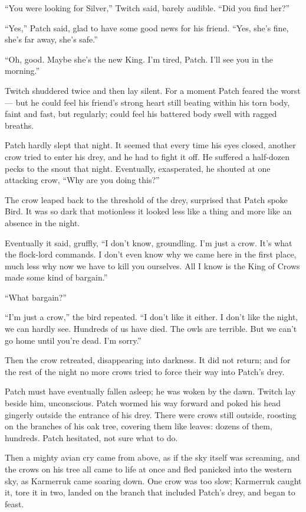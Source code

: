 \documentclass[ebook,oneside,openany,17pt]{memoir}
\newenvironment{tolerant}[1]{%
  \par\tolerance=#1\relax
}{%
  \par
}
\begin{document}
“You were looking for Silver,” Twitch said, barely audible. “Did you
find her?”

“Yes,” Patch said, glad to have some good news for his friend. “Yes,
she’s fine, she’s far away, she’s safe.”

“Oh, good. Maybe she’s the new King. I’m tired, Patch. I’ll see you in
the morning.”

Twitch shuddered twice and then lay silent. For a moment Patch feared
the worst — but he could feel his friend’s strong heart still beating
within his torn body, faint and fast, but regularly; could feel his
battered body swell with ragged breaths.

Patch hardly slept that night. It seemed that every time his eyes
closed, another crow tried to enter his drey, and he had to fight it
off. He suffered a half-dozen pecks to the snout that
night. Eventually, exasperated, he shouted at one attacking crow, “Why
are you doing this?”

The crow leaped back to the threshold of the drey, surprised that
Patch spoke Bird. It was so dark that motionless it looked less like a
thing and more like an absence in the night.

\begin{tolerant}{500}
Eventually it said, gruffly, “I don’t know, groundling. I’m just a
crow. It’s what the flock-lord commands. I don’t even know why we came
here in the first place, much less why now we have to kill you
ourselves. All I know is the King of Crows made some kind of bargain.”
\end{tolerant}

“What bargain?”

“I’m just a crow,” the bird repeated. “I don’t like it either. I don’t
like the night, we can hardly see. Hundreds of us have died. The owls
are terrible. But we can’t go home until you’re dead. I’m sorry.”

Then the crow retreated, disappearing into darkness. It did not
return; and for the rest of the night no more crows tried to force
their way into Patch’s drey.

Patch must have eventually fallen asleep; he was woken by the
dawn. Twitch lay beside him, unconscious. Patch wormed his way forward
and poked his head gingerly outside the entrance of his drey. There
were crows still outside, roosting on the branches of his oak tree,
covering them like leaves: dozens of them, hundreds. Patch hesitated,
not sure what to do.

Then a mighty avian cry came from above, as if the sky itself was
screaming, and the crows on his tree all came to life at once and fled
panicked into the western sky, as Karmerruk came soaring down. One
crow was too slow; Karmerruk caught it, tore it in two, landed on the
branch that included Patch’s drey, and began to feast.
\end{document}
